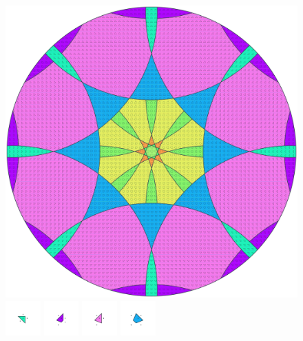 \documentclass[text.tex]{subfiles}
\begin{document}
\clearpage
\pagestyle{fancy}
\fancyhf{}
\begin{figure}[h!]
\centering
\includegraphics[width=1\textwidth]{img/results/circle8/circle8_177893_(5033_-2084alpha_1).pdf}
\includegraphics[width=0.12\textwidth]{img/results/circle8/circle8_177893_(5033_-2084alpha_1)_001.pdf}
\includegraphics[width=0.12\textwidth]{img/results/circle8/circle8_177893_(5033_-2084alpha_1)_002.pdf}
\includegraphics[width=0.12\textwidth]{img/results/circle8/circle8_177893_(5033_-2084alpha_1)_003.pdf}
\includegraphics[width=0.12\textwidth]{img/results/circle8/circle8_177893_(5033_-2084alpha_1)_004.pdf}

\end{figure}
\end{document}
